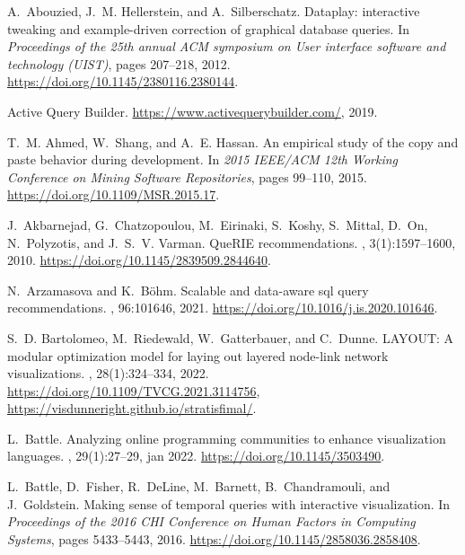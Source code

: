 \documentclass[letterpaper,11pt]{article}
\begin{document}
\begin{thebibliography}{100}

A.~Abouzied, J.~M. Hellerstein, and A.~Silberschatz.
\newblock Dataplay: interactive tweaking and example-driven correction of
  graphical database queries.
\newblock In {\em Proceedings of the 25th annual ACM symposium on User
  interface software and technology ({UIST})}, pages 207--218, 2012.
\newblock \url{https://doi.org/10.1145/2380116.2380144}.

{Active Query Builder}.
\newblock \url{https://www.activequerybuilder.com/}, 2019.

T.~M. Ahmed, W.~Shang, and A.~E. Hassan.
\newblock An empirical study of the copy and paste behavior during development.
\newblock In {\em 2015 IEEE/ACM 12th Working Conference on Mining Software
  Repositories}, pages 99--110, 2015.
\newblock \url{https://doi.org/10.1109/MSR.2015.17}.

J.~Akbarnejad, G.~Chatzopoulou, M.~Eirinaki, S.~Koshy, S.~Mittal, D.~On,
  N.~Polyzotis, and J.~S.~V. Varman.
 {QueRIE} recommendations.
, 3(1):1597--1600, 2010.
\newblock \url{https://doi.org/10.1145/2839509.2844640}.

N.~Arzamasova and K.~B{\"o}hm.
\newblock Scalable and data-aware sql query recommendations.
, 96:101646, 2021.
\newblock \url{https://doi.org/10.1016/j.is.2020.101646}.

S.~D. Bartolomeo, M.~Riedewald, W.~Gatterbauer, and C.~Dunne.
 {LAYOUT:} {A} modular optimization model for laying
  out layered node-link network visualizations.
,
  28(1):324--334, 2022.
\newblock \url{https://doi.org/10.1109/TVCG.2021.3114756},
  \url{https://visdunneright.github.io/stratisfimal/}.

L.~Battle.
\newblock Analyzing online programming communities to enhance visualization
  languages.
, 29(1):27--29, jan 2022.
\newblock \url{https://doi.org/10.1145/3503490}.

L.~Battle, D.~Fisher, R.~DeLine, M.~Barnett, B.~Chandramouli, and J.~Goldstein.
\newblock Making sense of temporal queries with interactive visualization.
\newblock In {\em Proceedings of the 2016 CHI Conference on Human Factors in
  Computing Systems}, pages 5433--5443, 2016.
\newblock \url{https://doi.org/10.1145/2858036.2858408}.


\end{thebibliography}
\end{document}
